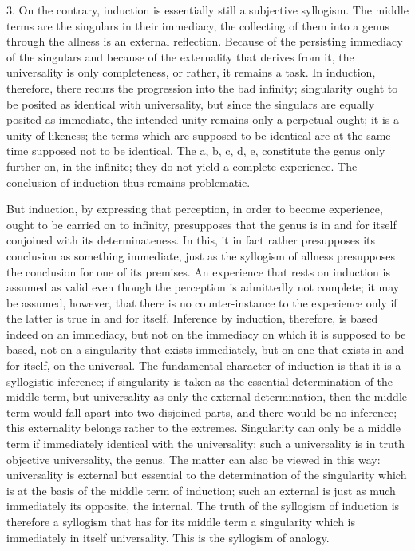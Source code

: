 3. On the contrary, induction is
essentially still a subjective syllogism.
The middle terms are the singulars in their immediacy,
the collecting of them into a genus through the allness
is an external reflection.
Because of the persisting immediacy of the singulars
and because of the externality that derives from it,
the universality is only completeness,
or rather, it remains a task.
In induction, therefore, there recurs
the progression into the bad infinity;
singularity ought to be posited as
identical with universality,
but since the singulars are equally posited as
immediate, the intended unity remains only a perpetual ought;
it is a unity of likeness;
the terms which are supposed to be identical are
at the same time supposed not to be identical.
The a, b, c, d, e, constitute the genus
only further on, in the infinite;
they do not yield a complete experience.
The conclusion of induction thus remains problematic.

But induction, by expressing that perception,
in order to become experience,
ought to be carried on to infinity,
presupposes that the genus is in and for itself
conjoined with its determinateness.
In this, it in fact rather presupposes
its conclusion as something immediate,
just as the syllogism of allness
presupposes the conclusion for one of its premises.
An experience that rests on induction is
assumed as valid even though
the perception is admittedly not complete;
it may be assumed, however,
that there is no counter-instance
to the experience only if
the latter is true in and for itself.
Inference by induction, therefore, is
based indeed on an immediacy,
but not on the immediacy on which it is supposed to be based,
not on a singularity that exists immediately,
but on one that exists in and for itself,
on the universal.
The fundamental character of induction is
that it is a syllogistic inference;
if singularity is taken as
the essential determination of the middle term,
but universality as only the external determination,
then the middle term would fall apart into two disjoined parts,
and there would be no inference;
this externality belongs rather to the extremes.
Singularity can only be a middle term
if immediately identical with the universality;
such a universality is in truth
objective universality, the genus.
The matter can also be viewed in this way:
universality is external but essential
to the determination of the singularity
which is at the basis of the middle term of induction;
such an external is just as much
immediately its opposite, the internal.
The truth of the syllogism of induction is therefore
a syllogism that has for its middle term a singularity
which is immediately in itself universality.
This is the syllogism of analogy.

